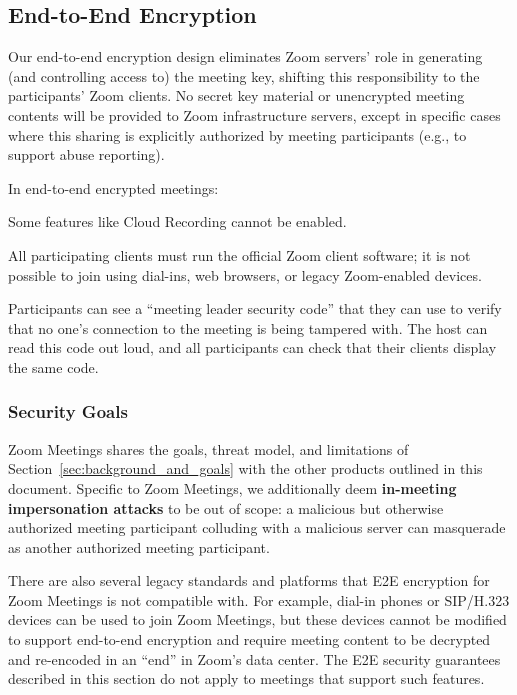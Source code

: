 \subsection{End-to-End Encryption}
Our end-to-end encryption design eliminates Zoom servers' role in generating (and controlling access
to) the meeting key, shifting this responsibility to the participants' Zoom clients. No secret key
material or unencrypted meeting contents will be provided to Zoom infrastructure servers, except in
specific cases where this sharing is explicitly authorized by meeting participants (e.g., to support
abuse reporting).

In end-to-end encrypted meetings:
\begin{itemize*}
   \item Some features like Cloud Recording cannot be enabled.
   \item All participating clients must run the official Zoom client software; it is not possible to
   join using dial-ins, web browsers, or legacy Zoom-enabled devices.
   \item Participants can see a ``meeting leader security code'' that they can use to verify that no
   one's connection to the meeting is being tampered with. The host can read this code out loud, and
   all participants can check that their clients display the same code.   
\end{itemize*}

\subsubsection{Security Goals}

Zoom Meetings shares the goals, threat model, and limitations of
Section~\ref{sec:background_and_goals} with the other products outlined in this document. Specific
to Zoom Meetings, we additionally deem {\bf in-meeting impersonation attacks} to be out of scope: a
malicious but otherwise authorized meeting participant colluding with a malicious server can
masquerade as another authorized meeting participant.

There are also several legacy standards and platforms that E2E encryption for Zoom Meetings is not
compatible with. For example, dial-in phones or SIP/H.323 devices can be used to join Zoom Meetings,
but these devices cannot be modified to support end-to-end encryption and require meeting content to
be decrypted and re-encoded in an ``end'' in Zoom's data center. The E2E security guarantees
described in this section do not apply to meetings that support such features.


